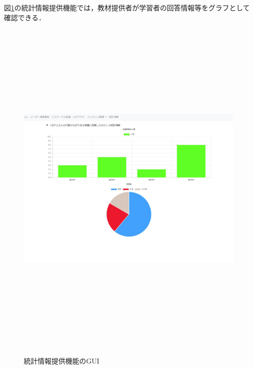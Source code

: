 \newpage
図\ref{toukei}の統計情報提供機能では，教材提供者が学習者の回答情報等をグラフとして確認できる．
\begin{figure}[htbp]
    \begin{center}
        \includegraphics[width=18cm,height=17cm,keepaspectratio]{toukei-crop.pdf}\\
    \end{center}
    \caption{統計情報提供機能のGUI}
    \label{toukei}
\end{figure}

